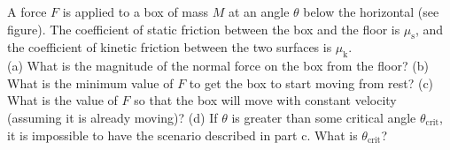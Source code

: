 A force $F$ is applied to a box of mass $M$ at an angle
$\theta$ below the horizontal (see figure). The coefficient of static
friction between the box and the floor is $\mu_\text{s}$, and the
coefficient of kinetic friction between the two surfaces is
$\mu_\text{k}$.\\
%
(a) What is the magnitude of the normal force on the box from the
floor?\answercheck\hwendpart
%
(b) What is the minimum value of $F$ to get the box to
start moving from rest?\answercheck\hwendpart
%
(c) What is the value of $F$ so that the box will move with
constant velocity (assuming it is already moving)?\answercheck\hwendpart
%
(d) If $\theta$ is greater than some critical angle $\theta_\text{crit}$, it is impossible to have
the scenario described in part c. What is
$\theta_\text{crit}$?\answercheck
